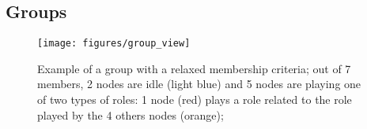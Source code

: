 


\subsection{Groups}

\begin{figure}[t!]
	\centering
	\texttt{[image: figures/group\_view]}
	\caption{Example of a group with a relaxed membership criteria; out of 7 members, 2 nodes are idle (light blue) and 5 nodes are playing one of two types of roles: 1 node (red) plays a role related to the role played by the 4 others nodes (orange);}
	\label{fig:group_view}
\end{figure}









